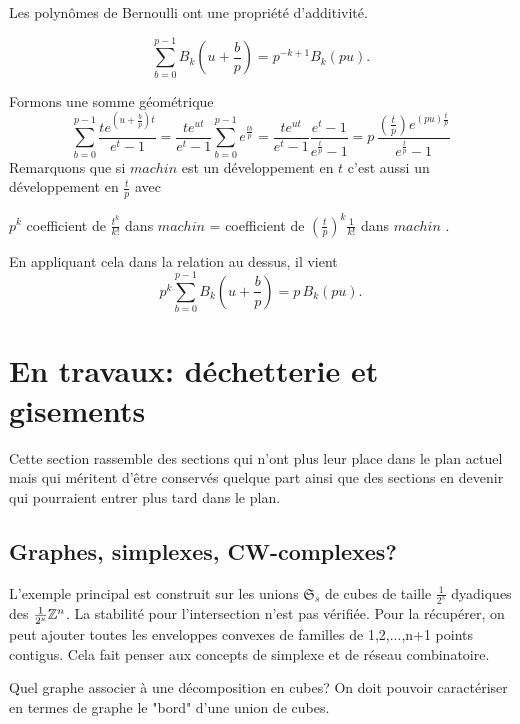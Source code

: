 Les polynômes de Bernoulli ont une propriété d'additivité.
\begin{prop}
\begin{displaymath}
   \sum_{b=0}^{p-1} B_k(u + \frac{b}{p}) = p^{-k + 1} B_k(pu).
\end{displaymath}
\end{prop}
\begin{demo}
Formons une somme géométrique
\begin{displaymath}
 \sum_{b=0}^{p-1} \frac{t e^{(u + \frac{b}{p})t}}{e^t - 1}
   = \frac{t e^{ut}}{e^t - 1} \sum_{b=0}^{p-1} e^\frac{tb}{p}
   = \frac{t e^{ut}}{e^t - 1} \frac{e^t -1 }{e^{\frac{t}{p}} - 1}
   = p \, \frac{(\frac{t}{p}) e^{(pu)\frac{t}{p}}}{e^{\frac{t}{p}} - 1}
\end{displaymath}
Remarquons que si $machin$ est un développement en $t$ c'est aussi un développement en $\frac{t}{p}$ avec
\begin{center}
 $p^k$ coefficient de $\frac{t^k}{k!}$ dans $machin$ = coefficient de $(\frac{t}{p})^k \frac{1}{k!}$ dans $machin$ .
\end{center}
En appliquant cela dans la relation au dessus, il vient
\begin{displaymath}
  p^k \sum_{b=0}^{p-1} B_k(u + \frac{b}{p}) = p \, B_k(pu).
\end{displaymath}
\end{demo}



\chapter{En travaux: déchetterie et gisements}
Cette section rassemble des sections qui n'ont plus leur place dans le plan actuel mais qui méritent d'être conservés quelque part ainsi que des sections en devenir qui pourraient entrer plus tard dans le plan.


\section{Graphes, simplexes, CW-complexes?}
L'exemple principal est construit sur les unions $\mathfrak{S}_s$ de cubes de taille $\frac{1}{2^s}$ dyadiques des $\frac{1}{2^s}\mathbb{Z}^n$. La stabilité pour l'intersection n'est pas vérifiée. Pour la récupérer, on peut ajouter toutes les enveloppes convexes de familles de 1,2,...,n+1 points contigus. Cela fait penser aux concepts de simplexe et de réseau combinatoire.

Quel graphe associer à une décomposition en cubes?
On doit pouvoir caractériser en termes de graphe le "bord" d'une union de cubes.

